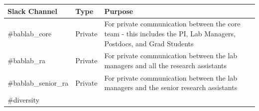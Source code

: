 \documentclass[]{book}
\begin{document}
\begin{longtable}[]{@{}lll@{}}
\toprule
\begin{minipage}[b]{0.18\columnwidth}\raggedright
Slack Channel\strut
\end{minipage} & \begin{minipage}[b]{0.04\columnwidth}\raggedright
Type\strut
\end{minipage} & \begin{minipage}[b]{0.70\columnwidth}\raggedright
Purpose\strut
\end{minipage}\tabularnewline
\midrule
\endhead
\begin{minipage}[t]{0.18\columnwidth}\raggedright
\#bablab\_core\strut
\end{minipage} & \begin{minipage}[t]{0.04\columnwidth}\raggedright
Private\strut
\end{minipage} & \begin{minipage}[t]{0.70\columnwidth}\raggedright
For private communication between the core team - this includes the PI, Lab Managers, Postdocs, and Grad Students\strut
\end{minipage}\tabularnewline
\begin{minipage}[t]{0.18\columnwidth}\raggedright
\#bablab\_ra\strut
\end{minipage} & \begin{minipage}[t]{0.04\columnwidth}\raggedright
Private\strut
\end{minipage} & \begin{minipage}[t]{0.70\columnwidth}\raggedright
For private communication between the lab managers and all the research assistants\strut
\end{minipage}\tabularnewline
\begin{minipage}[t]{0.18\columnwidth}\raggedright
\#bablab\_senior\_ra\strut
\end{minipage} & \begin{minipage}[t]{0.04\columnwidth}\raggedright
Private\strut
\end{minipage} & \begin{minipage}[t]{0.70\columnwidth}\raggedright
For private communication between the lab managers and the senior research assistants\strut
\end{minipage}\tabularnewline
\begin{minipage}[t]{0.18\columnwidth}\raggedright
\#diversity\strut
\end{minipage} & \begin{minipage}[t]{0.04\columnwidth}\raggedright

\end{minipage}
\end{longtable}
\end{document}
